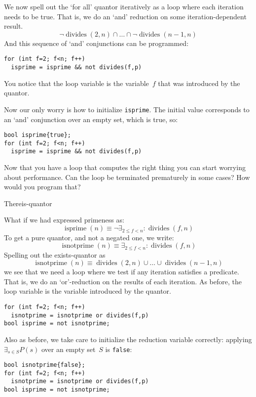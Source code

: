 We now spell out the `for all' quantor iteratively
as a loop where each iteration needs to be true.
That is, we do an `and' reduction on some iteration-dependent result.
\[ 
\neg\mathop{\mathrm{divides}}(2,n)
\cap \ldots \cap
\neg\mathop{\mathrm{divides}}(n-1,n)
\]
And this sequence of `and' conjunctions can be programmed:
\begin{lstlisting}
for (int f=2; f<n; f++)
  isprime = isprime && not divides(f,p)
\end{lstlisting}
You notice that the loop variable is the variable~$f$
that was introduced by the quantor.

Now our only worry is how to initialize \lstinline+isprime+.
The initial value corresponds to an `and' conjunction over
an empty set, which is true, so:
\begin{lstlisting}
bool isprime{true};
for (int f=2; f<n; f++)
  isprime = isprime && not divides(f,p)
\end{lstlisting}
\begin{exercise}
  Now that you have a loop that computes the right thing
  you can start worrying about performance.
  Can the loop be terminated prematurely in some cases?
  How would you program that?
\end{exercise}

 {Thereis-quantor}

What if we had expressed primeness as:
\[
\mathop{\mathrm{isprime}}(n) \equiv
\neg\exists_{2\leq f<n}\colon \mathop{\mathrm{divides}}(f,n)
\]
To get a pure quantor, and not a negated one,  we write:
\[
\mathop{\mathrm{isnotprime}}(n) \equiv
\exists_{2\leq f<n}\colon \mathop{\mathrm{divides}}(f,n)
\]
Spelling out the exists-quantor as
\[
\mathop{\mathrm{isnotprime}}(n) \equiv
\mathop{\mathrm{divides}}(2,n)
\cup \ldots \cup
\mathop{\mathrm{divides}}(n-1,n)
\]
we see that we need a loop
where we test if any iteration satisfies a predicate.
That is, we do an `or'-reduction on the results of each iteration.
As before, the loop variable is the variable introduced by the quantor.
\begin{lstlisting}
for (int f=2; f<n; f++)
  isnotprime = isnotprime or divides(f,p)
bool isprime = not isnotprime;
\end{lstlisting}

Also as before, we take care to initialize the reduction variable correctly:
applying $\exists_{s\in S}P(s)$ over an empty set~$S$ is \lstinline{false}:
\begin{lstlisting}
bool isnotprime{false};
for (int f=2; f<n; f++)
  isnotprime = isnotprime or divides(f,p)
bool isprime = not isnotprime;
\end{lstlisting}

